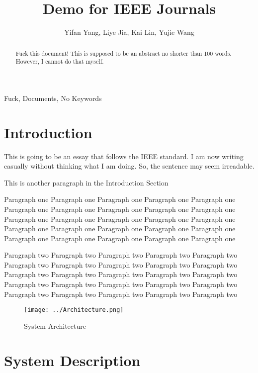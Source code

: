 \documentclass[10pt,journal,final,a4paper,nofonttune]{IEEEtran}
\title{Demo for IEEE Journals}
\author{Yifan Yang, Liye Jia, Kai Lin, Yujie Wang}
\begin{document}
\maketitle

\begin{abstract}
    Fuck this document! This is supposed to be an abstract no shorter 
    than 100 words. However, I cannot do that myself.
\end{abstract}

\begin{IEEEkeywords}
    Fuck, Documents, No Keywords
\end{IEEEkeywords}


\section{Introduction}
This is going to be an essay that follows the IEEE standard.
I am now writing casually without thinking what I am doing. So, the 
sentence may seem irreadable.
\cite{gomez2012overview}

This is another paragraph in the Introduction Section

Paragraph one Paragraph one Paragraph one Paragraph one Paragraph one 
Paragraph one Paragraph one Paragraph one Paragraph one Paragraph one 
Paragraph one Paragraph one Paragraph one Paragraph one Paragraph one 
Paragraph one Paragraph one Paragraph one Paragraph one Paragraph one 
Paragraph one Paragraph one Paragraph one Paragraph one Paragraph one 

Paragraph two Paragraph two Paragraph two Paragraph two Paragraph two 
Paragraph two Paragraph two Paragraph two Paragraph two Paragraph two 
Paragraph two Paragraph two Paragraph two Paragraph two Paragraph two 
Paragraph two Paragraph two Paragraph two Paragraph two Paragraph two 
Paragraph two Paragraph two Paragraph two Paragraph two Paragraph two 


\begin{figure*}[ht]
    \centering
    \begin{center}
        \caption{System Architecture}
    \end{center}
    \texttt{[image: ../Architecture.png]}
\end{figure*}


\section{System Description}
\end{document}
